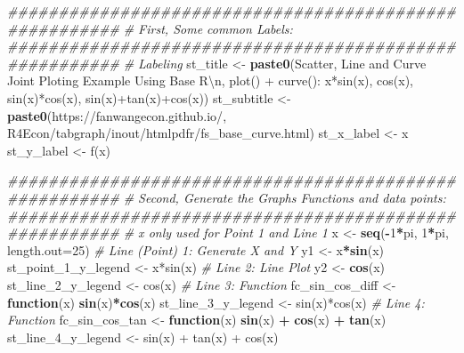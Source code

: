 \documentclass[
]{book}
\newenvironment{Shaded}{\begin{snugshade}}{\end{snugshade}}
\newcommand{\CharTok}[1]{\textcolor[rgb]{0.31,0.60,0.02}{#1}}
\newcommand{\CommentTok}[1]{\textcolor[rgb]{0.56,0.35,0.01}{\textit{#1}}}
\newcommand{\ControlFlowTok}[1]{\textcolor[rgb]{0.13,0.29,0.53}{\textbf{#1}}}
\newcommand{\DataTypeTok}[1]{\textcolor[rgb]{0.13,0.29,0.53}{#1}}
\newcommand{\DecValTok}[1]{\textcolor[rgb]{0.00,0.00,0.81}{#1}}
\newcommand{\KeywordTok}[1]{\textcolor[rgb]{0.13,0.29,0.53}{\textbf{#1}}}
\newcommand{\NormalTok}[1]{#1}
\newcommand{\OperatorTok}[1]{\textcolor[rgb]{0.81,0.36,0.00}{\textbf{#1}}}
\newcommand{\StringTok}[1]{\textcolor[rgb]{0.31,0.60,0.02}{#1}}
\begin{document}
\begin{Shaded}
\begin{Highlighting}[]
\CommentTok{\#\#\#\#\#\#\#\#\#\#\#\#\#\#\#\#\#\#\#\#\#\#\#\#\#\#\#\#\#\#\#\#\#\#\#\#\#\#\#\#\#\#\#\#\#\#\#\#\#\#\#\#\#\#\#}
\CommentTok{\# First, Some common Labels:}
\CommentTok{\#\#\#\#\#\#\#\#\#\#\#\#\#\#\#\#\#\#\#\#\#\#\#\#\#\#\#\#\#\#\#\#\#\#\#\#\#\#\#\#\#\#\#\#\#\#\#\#\#\#\#\#\#\#\#}
\CommentTok{\# Labeling}
\NormalTok{st\_title \textless{}{-}}\StringTok{ }\KeywordTok{paste0}\NormalTok{(}\StringTok{\textquotesingle{}Scatter, Line and Curve Joint Ploting Example Using Base R}\CharTok{\textbackslash{}n}\StringTok{\textquotesingle{}}\NormalTok{,}
                   \StringTok{\textquotesingle{}plot() + curve(): x*sin(x), cos(x), sin(x)*cos(x), sin(x)+tan(x)+cos(x)\textquotesingle{}}\NormalTok{)}
\NormalTok{st\_subtitle \textless{}{-}}\StringTok{ }\KeywordTok{paste0}\NormalTok{(}\StringTok{\textquotesingle{}https://fanwangecon.github.io/\textquotesingle{}}\NormalTok{,}
                      \StringTok{\textquotesingle{}R4Econ/tabgraph/inout/htmlpdfr/fs\_base\_curve.html\textquotesingle{}}\NormalTok{)}
\NormalTok{st\_x\_label \textless{}{-}}\StringTok{ \textquotesingle{}x\textquotesingle{}}
\NormalTok{st\_y\_label \textless{}{-}}\StringTok{ \textquotesingle{}f(x)\textquotesingle{}}

\CommentTok{\#\#\#\#\#\#\#\#\#\#\#\#\#\#\#\#\#\#\#\#\#\#\#\#\#\#\#\#\#\#\#\#\#\#\#\#\#\#\#\#\#\#\#\#\#\#\#\#\#\#\#\#\#\#\#}
\CommentTok{\# Second, Generate the Graphs Functions and data points:}
\CommentTok{\#\#\#\#\#\#\#\#\#\#\#\#\#\#\#\#\#\#\#\#\#\#\#\#\#\#\#\#\#\#\#\#\#\#\#\#\#\#\#\#\#\#\#\#\#\#\#\#\#\#\#\#\#\#\#}
\CommentTok{\# x only used for Point 1 and Line 1}
\NormalTok{x \textless{}{-}}\StringTok{ }\KeywordTok{seq}\NormalTok{(}\OperatorTok{{-}}\DecValTok{1}\OperatorTok{*}\NormalTok{pi, }\DecValTok{1}\OperatorTok{*}\NormalTok{pi, }\DataTypeTok{length.out=}\DecValTok{25}\NormalTok{)}
\CommentTok{\# Line (Point) 1: Generate X and Y}
\NormalTok{y1 \textless{}{-}}\StringTok{ }\NormalTok{x}\OperatorTok{*}\KeywordTok{sin}\NormalTok{(x)}
\NormalTok{st\_point\_}\DecValTok{1}\NormalTok{\_y\_legend \textless{}{-}}\StringTok{ \textquotesingle{}x*sin(x)\textquotesingle{}}
\CommentTok{\# Line 2: Line Plot}
\NormalTok{y2 \textless{}{-}}\StringTok{ }\KeywordTok{cos}\NormalTok{(x)}
\NormalTok{st\_line\_}\DecValTok{2}\NormalTok{\_y\_legend \textless{}{-}}\StringTok{ \textquotesingle{}cos(x)\textquotesingle{}}
\CommentTok{\# Line 3: Function}
\NormalTok{fc\_sin\_cos\_diff \textless{}{-}}\StringTok{ }\ControlFlowTok{function}\NormalTok{(x) }\KeywordTok{sin}\NormalTok{(x)}\OperatorTok{*}\KeywordTok{cos}\NormalTok{(x)}
\NormalTok{st\_line\_}\DecValTok{3}\NormalTok{\_y\_legend \textless{}{-}}\StringTok{ \textquotesingle{}sin(x)*cos(x)\textquotesingle{}}
\CommentTok{\# Line 4: Function}
\NormalTok{fc\_sin\_cos\_tan \textless{}{-}}\StringTok{ }\ControlFlowTok{function}\NormalTok{(x) }\KeywordTok{sin}\NormalTok{(x) }\OperatorTok{+}\StringTok{ }\KeywordTok{cos}\NormalTok{(x) }\OperatorTok{+}\StringTok{ }\KeywordTok{tan}\NormalTok{(x)}
\NormalTok{st\_line\_}\DecValTok{4}\NormalTok{\_y\_legend \textless{}{-}}\StringTok{ \textquotesingle{}sin(x) + tan(x) + cos(x)\textquotesingle{}}


\end{Highlighting}
\end{Shaded}
\end{document}
